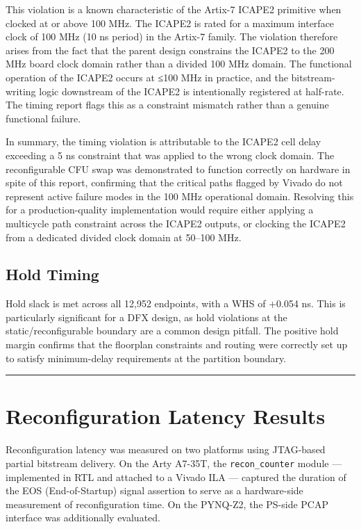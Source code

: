 This violation is a known characteristic of the Artix-7 ICAPE2 primitive when clocked at or above 100 MHz. The ICAPE2 is rated for a maximum interface clock of 100 MHz (10 ns period) in the Artix-7 family. The violation therefore arises from the fact that the parent design constrains the ICAPE2 to the 200 MHz board clock domain rather than a divided 100 MHz domain. The functional operation of the ICAPE2 occurs at ≤100 MHz in practice, and the bitstream-writing logic downstream of the ICAPE2 is intentionally registered at half-rate. The timing report flags this as a constraint mismatch rather than a genuine functional failure.

In summary, the timing violation is attributable to the ICAPE2 cell delay exceeding a 5 ns constraint that was applied to the wrong clock domain. The reconfigurable CFU swap was demonstrated to function correctly on hardware in spite of this report, confirming that the critical paths flagged by Vivado do not represent active failure modes in the 100 MHz operational domain. Resolving this for a production-quality implementation would require either applying a multicycle path constraint across the ICAPE2 outputs, or clocking the ICAPE2 from a dedicated divided clock domain at 50–100 MHz.

\subsection{Hold Timing}

Hold slack is met across all 12,952 endpoints, with a WHS of +0.054 ns. This is particularly significant for a DFX design, as hold violations at the static/reconfigurable boundary are a common design pitfall. The positive hold margin confirms that the floorplan constraints and routing were correctly set up to satisfy minimum-delay requirements at the partition boundary.

\vspace{0.4em}\hrule\vspace{0.4em}

\section{Reconfiguration Latency Results}

Reconfiguration latency was measured on two platforms using JTAG-based partial bitstream delivery. On the Arty A7-35T, the \texttt{recon\_counter} module — implemented in RTL and attached to a Vivado ILA — captured the duration of the EOS (End-of-Startup) signal assertion to serve as a hardware-side measurement of reconfiguration time. On the PYNQ-Z2, the PS-side PCAP interface was additionally evaluated.

